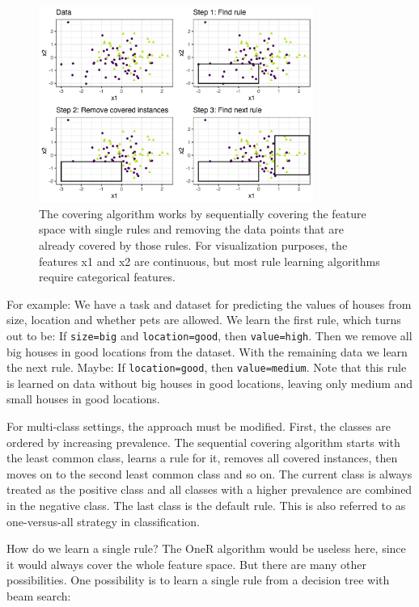 \documentclass[
  11pt,
]{scrbook}
\begin{document}
\begin{figure}

{\centering \includegraphics[width=0.8\textwidth]{images/covering-algo-1} 

}

\caption{The covering algorithm works by sequentially covering the feature space with single rules and removing the data points that are already covered by those rules. For visualization purposes, the features x1 and x2 are continuous, but most rule learning algorithms require categorical features.}\label{fig:covering-algo}
\end{figure}

For example:
We have a task and dataset for predicting the values of houses from size, location and whether pets are allowed.
We learn the first rule, which turns out to be:
If \texttt{size=big} and \texttt{location=good}, then \texttt{value=high}.
Then we remove all big houses in good locations from the dataset.
With the remaining data we learn the next rule.
Maybe: If \texttt{location=good}, then \texttt{value=medium}.
Note that this rule is learned on data without big houses in good locations, leaving only medium and small houses in good locations.

For multi-class settings, the approach must be modified.
First, the classes are ordered by increasing prevalence.
The sequential covering algorithm starts with the least common class, learns a rule for it, removes all covered instances, then moves on to the second least common class and so on.
The current class is always treated as the positive class and all classes with a higher prevalence are combined in the negative class.
The last class is the default rule.
This is also referred to as one-versus-all strategy in classification.

How do we learn a single rule?
The OneR algorithm would be useless here, since it would always cover the whole feature space.
But there are many other possibilities.
One possibility is to learn a single rule from a decision tree with beam search:
\end{document}
